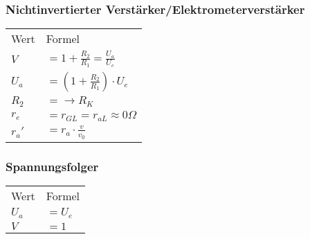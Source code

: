     \subsubsection{Nichtinvertierter Verstärker/Elektrometerverstärker}
        \begin{minipage}{0.6\columnwidth}
            \renewcommand{\arraystretch}{1.1}
            \begin{table}[H]
                \begin{tabularx}{\columnwidth}{l l}
                    Wert  & Formel \\
                    $V$   & $=1+\frac{R_2}{R_1}=\frac{U_a}{U_e}$ \\
                    $U_a$ & $=(1+\frac{R_2}{R_1})\cdot U_e$ \\
                    $R_2$ & $=\longrightarrow R_K$\\
                    $r_e$ & $=r_{GL}=r_{aL}\approx 0\Omega$ \\
                    $r_a'$& $=r_a\cdot\frac{v}{v_0}$\\
                \end{tabularx}
            \end{table}
        \end{minipage}
        \begin{minipage}{0.4\columnwidth}
        \end{minipage}
    \subsubsection{Spannungsfolger}
        \begin{minipage}{0.6\columnwidth}
            \begin{table}[H]
                \begin{tabularx}{\columnwidth}{l l}
                    Wert  & Formel \\
                    $U_a$ & $=U_e$ \\
                    $V$   & $=1$ \\
                \end{tabularx}
            \end{table}
        \end{minipage}
        \begin{minipage}{0.4\columnwidth}
        \end{minipage}
